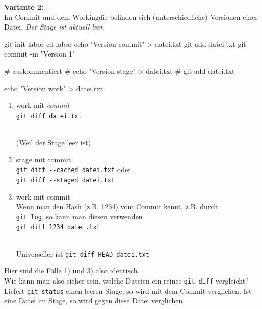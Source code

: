 \documentclass[
  letterpaper,
  DIV=11]{scrreprt}
\newenvironment{Shaded}{\begin{snugshade}}{\end{snugshade}}
\newcommand{\AttributeTok}[1]{\textcolor[rgb]{0.40,0.45,0.13}{#1}}
\newcommand{\BuiltInTok}[1]{\textcolor[rgb]{0.00,0.23,0.31}{#1}}
\newcommand{\CommentTok}[1]{\textcolor[rgb]{0.37,0.37,0.37}{#1}}
\newcommand{\FunctionTok}[1]{\textcolor[rgb]{0.28,0.35,0.67}{#1}}
\newcommand{\NormalTok}[1]{\textcolor[rgb]{0.00,0.23,0.31}{#1}}
\newcommand{\OperatorTok}[1]{\textcolor[rgb]{0.37,0.37,0.37}{#1}}
\newcommand{\StringTok}[1]{\textcolor[rgb]{0.13,0.47,0.30}{#1}}
\providecommand{\tightlist}{%
  \setlength{\itemsep}{0pt}\setlength{\parskip}{0pt}}\usepackage{longtable,booktabs,array}
\begin{document}
\textbf{Variante 2:}\\
Im Commit und dem Workingdir befinden sich (unterschiedliche) Versionen
einer Datei. \emph{Der Stage ist aktuell leer.}

\begin{Shaded}
\begin{Highlighting}[]
\FunctionTok{git}\NormalTok{ init labor}
\BuiltInTok{cd}\NormalTok{ labor }
\BuiltInTok{echo} \StringTok{"Version commit"} \OperatorTok{\textgreater{}}\NormalTok{ datei.txt }
\FunctionTok{git}\NormalTok{ add datei.txt }
\FunctionTok{git}\NormalTok{ commit }\AttributeTok{{-}m} \StringTok{"Version 1"}

\CommentTok{\# auskommentiert}
\CommentTok{\# echo "Version stage" \textgreater{} datei.txt }
\CommentTok{\# git add datei.txt }

\BuiltInTok{echo} \StringTok{"Version work"} \OperatorTok{\textgreater{}}\NormalTok{ datei.txt }
\end{Highlighting}
\end{Shaded}

\begin{enumerate}
\def\labelenumi{\arabic{enumi}.}
\tightlist
\item
  work mit \emph{commit}\\
  \texttt{git\ diff\ datei.txt}\strut \\
  (Weil der Stage leer ist)
\item
  stage mit commit\\
  \texttt{git\ diff\ -\/-cached\ datei.txt} oder\\
  \texttt{git\ diff\ -\/-staged\ datei.txt}
\item
  work mit commit\\
  Wenn man den Hash (z.B. 1234) vom Commit kennt, z.B. durch\\
  \texttt{git\ log}, so kann man diesen verwenden\\
  \texttt{git\ diff\ 1234\ datei.txt}\strut \\
  Universeller ist \texttt{git\ diff\ HEAD\ datei.txt}
\end{enumerate}

Hier sind die Fälle 1) und 3) also identisch.\\
Wie kann man also sicher sein, welche Dateien ein reines
\texttt{git\ diff} vergleicht?\\
Liefert \texttt{git\ status} einen leeren Stage, so wird mit dem Commit
verglichen. Ist eine Datei im Stage, so wird gegen diese Datei
verglichen.
\end{document}
